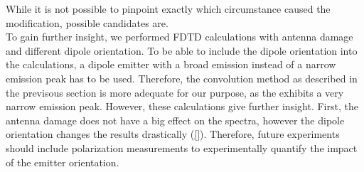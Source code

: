 			While it is not possible to pinpoint exactly which circumstance caused the modification, possible candidates are.
			\\
			To gain further insight, we performed FDTD calculations with antenna damage and different dipole orientation.
			To be able to include the dipole orientation into the calculations, a dipole emitter with a broad emission instead of a narrow emission peak has to be used.
			Therefore, the convolution method as described in the previsous section is more adequate for our purpose, as the \siv exhibits a very narrow emission peak.
			However, these calculations give further insight.
			First, the antenna damage does not have a big effect on the spectra, however the dipole orientation changes the results drastically (\cref{}). 
			Therefore, future experiments should include polarization measurements to experimentally quantify the impact of the emitter orientation.

